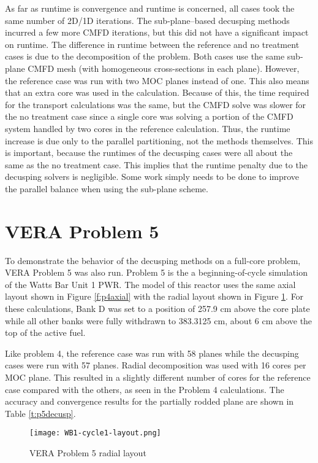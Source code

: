 As far as runtime is convergence and runtime is concerned, all cases took the same number of 2D/1D iterations.  The sub-plane--based decusping methods incurred a few more CMFD iterations, but this did not have a significant impact on runtime.  The difference in runtime between the reference and no treatment cases is due to the decomposition of the problem.  Both cases use the same sub-plane CMFD mesh (with homogeneous cross-sections in each plane).  However, the reference case was run with two MOC planes instead of one.  This also means that an extra core was used in the calculation.  Because of this, the time required for the transport calculations was the same, but the CMFD solve was slower for the no treatment case since a single core was solving a portion of the CMFD system handled by two cores in the reference calculation.  Thus, the runtime increase is due only to the parallel partitioning, not the methods themselves.  This is important, because the runtimes of the decusping cases were all about the same as the no treatment case.  This implies that the runtime penalty due to the decusping solvers is negligible.  Some work simply needs to be done to improve the parallel balance when using the sub-plane scheme.

\section{VERA Problem 5}

To demonstrate the behavior of the decusping methods on a full-core problem, VERA Problem 5 was also run.  Problem 5 is the a beginning-of-cycle simulation of the Watts Bar Unit 1 PWR.  The model of this reactor uses the same axial layout shown in Figure \ref{f:p4axial} with the radial layout shown in Figure \ref{f:p5radial}.  For these calculations, Bank D was set to a position of 257.9 cm above the core plate while all other banks were fully withdrawn to 383.3125 cm, about 6 cm above the top of the active fuel.

Like problem 4, the reference case was run with 58 planes while the decusping cases were run with 57 planes.  Radial decomposition was used with 16 cores per MOC plane.  This resulted in a slightly different number of cores for the reference case compared with the others, as seen in the Problem 4 calculations.  The accuracy and convergence results for the partially rodded plane are shown in Table \ref{t:p5decusp}.

\begin{figure}[h]
\centering
\texttt{[image: WB1-cycle1-layout.png]}
\caption{VERA Problem 5 radial layout}\label{f:p5radial}
\end{figure}

